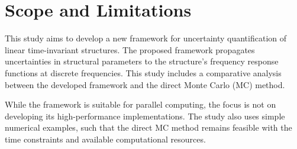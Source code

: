 %
%

\section{Scope and Limitations}
\label{sec: scope}

This study aims to develop a new framework for uncertainty quantification of linear time-invariant structures.
The proposed framework propagates uncertainties in structural parameters to the structure's frequency response functions at discrete frequencies.
This study includes a comparative analysis between the developed framework and the direct Monte Carlo (MC) method.

While the framework is suitable for parallel computing, the focus is not on developing its high-performance implementations.
The study also uses simple numerical examples, such that the direct MC method remains feasible with the time constraints and available computational resources.